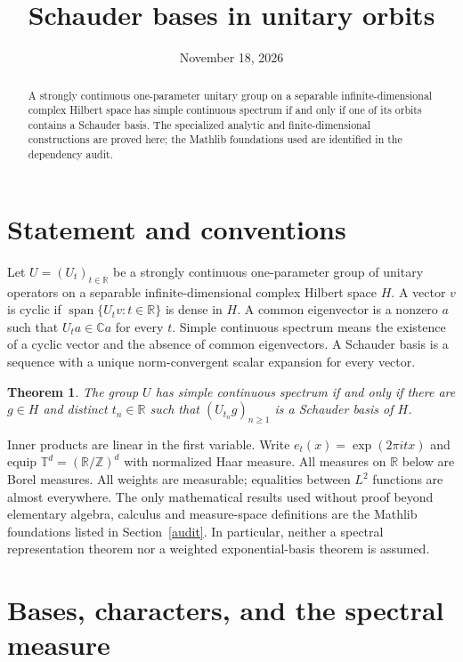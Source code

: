 \documentclass[reqno,a4paper,12pt]{amsart}
\title{Schauder bases in unitary orbits}
\date{November 18, 2026}
\newtheorem{theorem}{Theorem}
\newcommand{\R}{\mathbb R}
\newcommand{\C}{\mathbb C}
\newcommand{\T}{\mathbb T}
\newcommand{\Z}{\mathbb Z}
\newcommand{\spn}{\operatorname{span}}
\begin{document}
\begin{abstract}
A strongly continuous one-parameter unitary group on a separable
infinite-dimensional complex Hilbert space has simple continuous spectrum
if and only if one of its orbits contains a Schauder basis.
The specialized analytic and finite-dimensional constructions are proved
here; the Mathlib foundations used are identified in the dependency audit.
\end{abstract}
\maketitle

\section{Statement and conventions}
Let $U=(U_t)_{t\in\R}$ be a strongly continuous one-parameter group of
unitary operators on a separable infinite-dimensional complex Hilbert space $H$.
A vector $v$ is cyclic if $\spn\{U_tv:t\in\R\}$ is dense in $H$.
A common eigenvector is a nonzero $a$ such that $U_ta\in\C a$ for every $t$.
Simple continuous spectrum means the existence of a cyclic vector and
the absence of common eigenvectors.
A Schauder basis is a sequence with a unique norm-convergent scalar
expansion for every vector.

\begin{theorem}\label{thm:main}
The group $U$ has simple continuous spectrum if and only if there are
$g\in H$ and distinct $t_n\in\R$ such that $(U_{t_n}g)_{n\ge1}$
is a Schauder basis of $H$.
\end{theorem}

Inner products are linear in the first variable. Write
$e_t(x)=\exp(2\pi itx)$ and equip $\T^d=(\R/\Z)^d$ with normalized
Haar measure. All measures on $\R$ below are Borel measures. All weights
are measurable; equalities between $L^2$ functions are almost everywhere.
The only mathematical results used without proof beyond elementary
algebra, calculus and measure-space definitions are the Mathlib foundations
listed in Section~\ref{audit}. In particular, neither a spectral
representation theorem nor a weighted exponential-basis theorem is assumed.

\section{Bases, characters, and the spectral measure}
\end{document}
